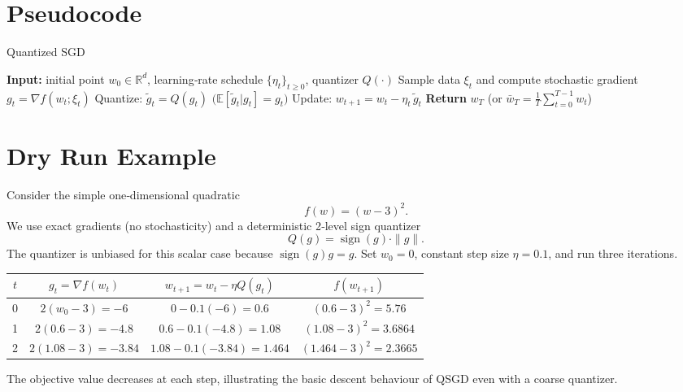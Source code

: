 \documentclass{article}
\newcommand{\E}{\mathbb{E}}
\newcommand{\R}{\mathbb{R}}
\begin{document}
\section*{Pseudocode}
\begin{algorithm}[H]
\caption{Quantized SGD}
\begin{algorithmic}[1]
\STATE \textbf{Input:} initial point $w_0\in\R^d$, learning‑rate schedule $\{\eta_t\}_{t\ge0}$, quantizer $Q(\cdot)$
    \STATE Sample data $\xi_t$ and compute stochastic gradient $g_t=\nabla f(w_t;\xi_t)$
    \STATE Quantize: $\tilde g_t = Q(g_t)$ \hfill $\bigl(\E[\tilde g_t|g_t]=g_t\bigr)$
    \STATE Update: $w_{t+1}=w_t-\eta_t\,\tilde g_t$
\ENDFOR
\STATE \textbf{Return} $w_T$ (or $\bar w_T=\frac1T\sum_{t=0}^{T-1}w_t$)
\end{algorithmic}
\end{algorithm}

\section*{Dry Run Example}
Consider the simple one‑dimensional quadratic
\[
    f(w)=(w-3)^2 .
\]
We use exact gradients (no stochasticity) and a deterministic 2‑level sign quantizer
\[
    Q(g)=\operatorname{sign}(g)\cdot\|g\| .
\]
The quantizer is unbiased for this scalar case because $\operatorname{sign}(g)g=g$.
Set $w_0=0$, constant step size $\eta=0.1$, and run three iterations.

\begin{center}
\begin{tabular}{c|c|c|c}
$t$ & $g_t=\nabla f(w_t)$ & $w_{t+1}=w_t-\eta Q(g_t)$ & $f(w_{t+1})$\\ \hline
0 & $2(w_0-3)=-6$ & $0-0.1(-6)=0.6$ & $(0.6-3)^2=5.76$\\
1 & $2(0.6-3)=-4.8$ & $0.6-0.1(-4.8)=1.08$ & $(1.08-3)^2=3.6864$\\
2 & $2(1.08-3)=-3.84$ & $1.08-0.1(-3.84)=1.464$ & $(1.464-3)^2=2.3665$\\
\end{tabular}
\end{center}
The objective value decreases at each step, illustrating the basic descent behaviour of QSGD even with a coarse quantizer.

\end{document}
